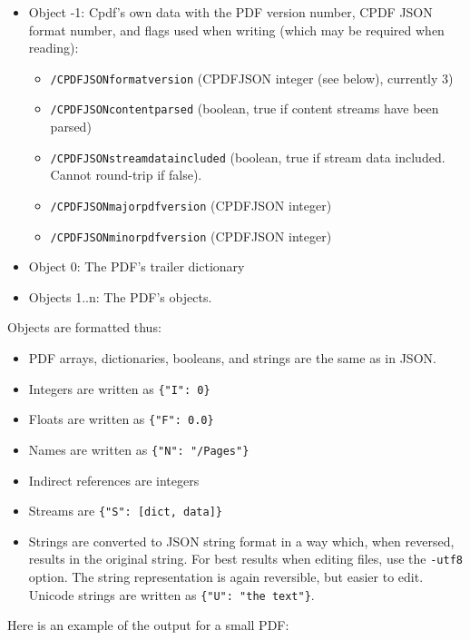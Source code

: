 \documentclass{book}
\begin{document}
\begin{itemize}
\item Object -1: Cpdf's own data with the PDF version number, CPDF JSON format
number, and flags used when writing (which may be required when reading):

\begin{itemize}
  \item \texttt{/CPDFJSONformatversion} (CPDFJSON integer (see below), currently 3)
  \item \texttt{/CPDFJSONcontentparsed} (boolean, true if content streams have been parsed)
  \item \texttt{/CPDFJSONstreamdataincluded} (boolean, true if stream data included. Cannot
  round-trip if false).
  \item \texttt{/CPDFJSONmajorpdfversion} (CPDFJSON integer)
  \item \texttt{/CPDFJSONminorpdfversion} (CPDFJSON integer)
\end{itemize}

\item Object 0: The PDF's trailer dictionary

\item Objects 1..n: The PDF's objects.
\end{itemize}

\noindent Objects are formatted thus:

\begin{itemize}
  \item PDF arrays, dictionaries, booleans, and strings are the same as in JSON.
  \item Integers are written as \texttt{\{"I":\ 0\}}
  \item Floats are written as \texttt{\{"F":\ 0.0\}}
  \item Names are written as \texttt{\{"N":\ "/Pages"\}}
  \item Indirect references are integers
  \item Streams are \texttt{\{"S":\ [dict, data]\}}
  \item Strings are converted to JSON string format in a way which, when reversed, results in the original string. For best results when editing files, use the \texttt{-utf8} option. The string representation is again reversible, but easier to edit. Unicode strings are written as \texttt{\{"U":\ "the text"\}}.
\end{itemize}

\noindent Here is an example of the output for a small PDF:
\end{document}
